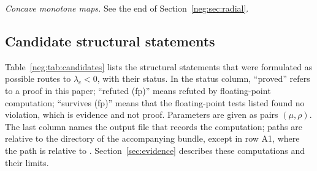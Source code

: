 \emph{Concave monotone maps.} See the end of Section~\ref{neg:sec:radial}.

\subsection{Candidate structural statements}\label{neg:sec:candidates}
Table~\ref{neg:tab:candidates} lists the structural statements that were formulated as possible routes to $\lambda_c<0$, with their status. In the status column, ``proved'' refers to a proof in this paper; ``refuted (fp)'' means refuted by floating-point computation; ``survives (fp)'' means that the floating-point tests listed found no violation, which is evidence and not proof. Parameters are given as pairs $(\mu,\rho)$. The last column names the output file that records the computation; paths are relative to the directory  of the accompanying bundle, except in row A1, where the path is relative to . Section~\ref{sec:evidence} describes these computations and their limits.

